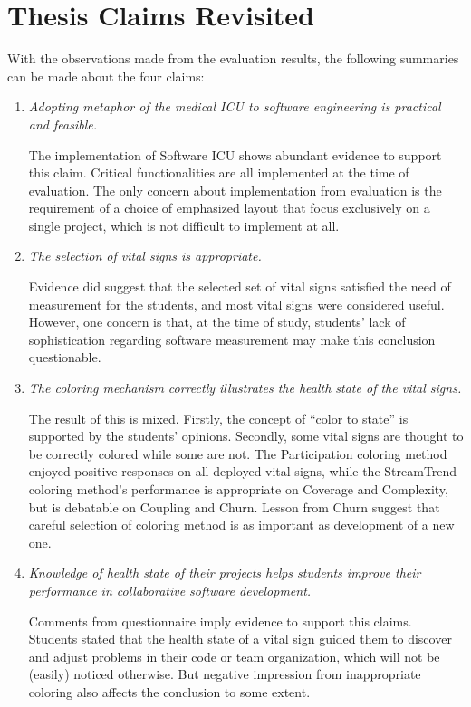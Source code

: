 \section {Thesis Claims Revisited}
With the observations made from the evaluation results, the following summaries can be made about the four claims:
\begin{enumerate}
\item {\it Adopting metaphor of the medical ICU to software engineering is practical and feasible.}

The implementation of Software ICU shows abundant evidence to support this claim. Critical functionalities are all implemented at the time of evaluation. The only concern about implementation from evaluation is the requirement of a choice of emphasized layout that focus  exclusively on a single project, which is not difficult to implement at all.
\item {\it The selection of vital signs is appropriate.}

Evidence did suggest that the selected set of vital signs satisfied the need of measurement for the students, and most vital signs were considered useful. However, one concern is that, at the time of study, students' lack of sophistication regarding software measurement may make this conclusion questionable.
\item {\it The coloring mechanism correctly illustrates the health state of the vital signs.}

The result of this is mixed. Firstly, the concept of ``color to state'' is supported by the students' opinions. Secondly, some vital signs are thought to be correctly colored while some are not. The Participation coloring method enjoyed positive responses on all deployed vital signs, while the StreamTrend coloring method's performance is appropriate on Coverage and Complexity, but is debatable on Coupling and Churn. Lesson from Churn suggest that careful selection of coloring method is as important as development of a new one.
\item {\it Knowledge of health state of their projects helps students improve their performance in collaborative software development.}

Comments from questionnaire imply evidence to support this claims. Students stated that the health state of a vital sign guided them to discover and adjust problems in their code or team organization, which will not be (easily) noticed otherwise. But negative impression from inappropriate coloring also affects the conclusion to some extent. 
\end{enumerate}

